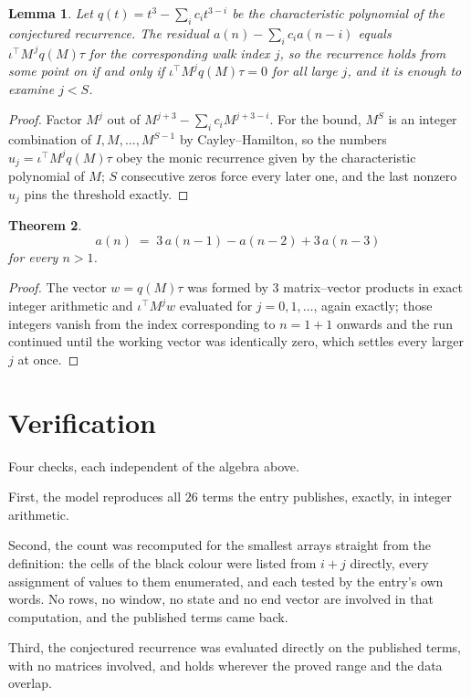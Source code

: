 \documentclass[11pt,a4paper]{article}
\theoremstyle{plain}
\newtheorem{theorem}{Theorem}
\newtheorem{lemma}[theorem]{Lemma}
\theoremstyle{definition}
\begin{document}
\begin{lemma}\label{lem:crit}
Let $q(t)=t^{3}-\sum_i c_it^{3-i}$ be the characteristic polynomial of the
conjectured recurrence. The residual $a(n)-\sum_ic_ia(n-i)$ equals
$\iota^{\!\top}M^{\,j}q(M)\tau$ for the corresponding walk index $j$, so the recurrence
holds from some point on if and only if $\iota^{\!\top}M^{j}q(M)\tau=0$ for all large $j$,
and it is enough to examine $j<S$.
\end{lemma}

\begin{proof}
Factor $M^{j}$ out of $M^{j+3}-\sum_ic_iM^{j+3-i}$. For the bound, $M^{S}$
is an integer combination of $I,M,\dots,M^{S-1}$ by Cayley--Hamilton, so the numbers
$u_j=\iota^{\!\top}M^{j}q(M)\tau$ obey the monic recurrence given by the characteristic
polynomial of $M$; $S$ consecutive zeros force every later one, and the last nonzero $u_j$
pins the threshold exactly.
\end{proof}

\begin{theorem}
\[
a(n)\;=\;3\,a(n-1) - a(n-2) + 3\,a(n-3)
\]
for every $n>1$.
\end{theorem}

\begin{proof}
The vector $w=q(M)\tau$ was formed by $3$ matrix--vector products in exact integer
arithmetic and $\iota^{\!\top}M^{j}w$ evaluated for $j=0,1,\dots$, again exactly; those
integers vanish from the index corresponding to $n=1+1$ onwards and the run continued
until the working vector was identically zero, which settles every larger $j$ at once.
\end{proof}

\section{Verification}

Four checks, each independent of the algebra above.

First, the model reproduces all $26$ terms the entry publishes, exactly, in integer
arithmetic.

Second, the count was recomputed for the smallest arrays straight from the definition: the cells
of the black colour were listed from $i+j$ directly, every assignment of values to them
enumerated, and each tested by the entry's own words. No rows, no window, no state and no end
vector are involved in that computation, and the published terms came back.

Third, the conjectured recurrence was evaluated directly on the published terms, with no
matrices involved, and holds wherever the proved range and the data overlap.
\end{document}
